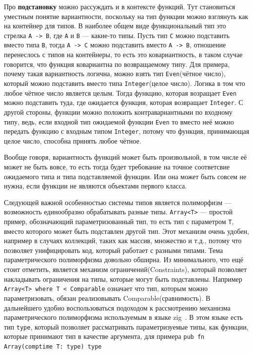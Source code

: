 \documentclass[times]{itmo-student-thesis}
\begin{document}
	Про \textbf{подстановку} можно рассуждать и в контексте функций. Тут становиться уместным понятие вариантности, поскольку на тип функции можно взглянуть как на контейнер для типов. В наиболее общем виде функциональный тип это стрелка  \lstinline{A -> B}, где  \lstinline{A} и  \lstinline{B} --- какие-то типы. Пусть тип  \lstinline{C} можно подставить вместо типа  \lstinline{B}, тогда  \lstinline{A -> C} можно подставить вместо  \lstinline{A -> B}, отношение перенеслось с типов на контейнеры, то есть это ковариантность, в таком случае говорится, что функция ковариантна по возвращаемому типу. Для примера, почему такая вариантность логична, можно взять тип  \lstinline{Even}(чётное число), который можно подставить вместо типа  \lstinline{Integer}(целое число). Логика в том что любое чётное число является целым. Тогда функцию, которая возращает  \lstinline{Even} можно подставить туда, где ожидается функция, которая возвращает  \lstinline{Integer}. С другой стороны, функции можно положить контравариантными по входному типу, ведь, если входной тип ожидаемой функции  \lstinline{Even} то вместо неё можно передать функцию с входным типом  \lstinline{Integer}, потому что функция, принимающая целое число, способна принять любое чётное.
	
	Вообще говоря, вариантность функций может быть произвольной, в том числе её может не быть вовсе, то есть тогда будет требование на точное соответсвие ожидаемого типа и типа подставляемой функции. Или она может быть совсем не нужна, если функции не являются объектами первого класса.
	
	Следующей важной особенностью системы типов является полиморфизм --- возможность единообразно обрабатывать разные типы.  \lstinline{Array<T>} --- простой пример, обозначающий параметризованный тип, то есть тип с параметром \lstinline{T}, вместо которого может быть подставлен другой тип. Этот механизм очень удобен, например в случаях коллекций, таких как массив, множество и т.д., потому что позволяет унифицировать код, который работает с разными типами. Тема параметрического полиморфизма довольно обширна. Из минимального, что ещё стоит отметить, является механизм ограничений(Constraints), который позволяет накладывать ограничения на типы, которые могут быть подставлены. Например  \lstinline{Array<T> where T < Comparable} означает что тип, которым можно параметризовать, обязан реализовывать Comparable(сравнимость). В дальнейшего удобно воспользоваться подоходом к рассмотрению механизма параметрического полиморфизма используемым в языке zig~\cite{ziggenerics}. В этом языке есть тип \lstinline{type}, который позволяет рассматривать параметризуемые типы, как функции, которые принимают тип в качестве аргумента, для примера \lstinline{pub fn Array(comptime T: type) type} 
	
\end{document}
